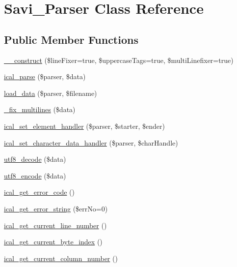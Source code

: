 \hypertarget{classSavi__Parser}{
\section{Savi\_\-Parser Class Reference}
\label{classSavi__Parser}
}
\subsection*{Public Member Functions}
\begin{DoxyCompactItemize}
\item 
\hyperlink{classSavi__Parser_a242c7fe86fb7c62f11f9212afbfa6112}{\_\-\_\-construct} (\$lineFixer=true, \$uppercaseTags=true, \$multiLinefixer=true)
\item 
\hyperlink{classSavi__Parser_a26a305bbf09bf4742f1da2262f6c5ae2}{ical\_\-parse} (\$parser, \$data)
\item 
\hyperlink{classSavi__Parser_a866029e3a4a8f04843dc6735368ec3e7}{load\_\-data} (\$parser, \$filename)
\item 
\hyperlink{classSavi__Parser_aff34336fb5f79c52c0a06ac3c5a50291}{\_\-fix\_\-multilines} (\$data)
\item 
\hyperlink{classSavi__Parser_af5040d51f1be467234b13837eefc9d53}{ical\_\-set\_\-element\_\-handler} (\$parser, \$starter, \$ender)
\item 
\hyperlink{classSavi__Parser_a9167bc8a37cf9e9766b1f82f5784cdaf}{ical\_\-set\_\-character\_\-data\_\-handler} (\$parser, \$charHandle)
\item 
\hyperlink{classSavi__Parser_a0af36ab5229619c8c396d454c8c89116}{utf8\_\-decode} (\$data)
\item 
\hyperlink{classSavi__Parser_a9e9a4aca94f8a18a6fbc1dbc27ba594b}{utf8\_\-encode} (\$data)
\item 
\hyperlink{classSavi__Parser_abbb9a24b226831f7ebf5d27b9754b69e}{ical\_\-get\_\-error\_\-code} ()
\item 
\hyperlink{classSavi__Parser_a77d83b11f08a322cae57654f43ed0b22}{ical\_\-get\_\-error\_\-string} (\$errNo=0)
\item 
\hyperlink{classSavi__Parser_a099de2f0a6cf07f9433080fb3a38556d}{ical\_\-get\_\-current\_\-line\_\-number} ()
\item 
\hyperlink{classSavi__Parser_a7dd9766590f266ab55bd78d7e9ac2963}{ical\_\-get\_\-current\_\-byte\_\-index} ()
\item 
\hyperlink{classSavi__Parser_a88fdf5a60b67329b81255715822af3a5}{ical\_\-get\_\-current\_\-column\_\-number} ()
\end{DoxyCompactItemize}
